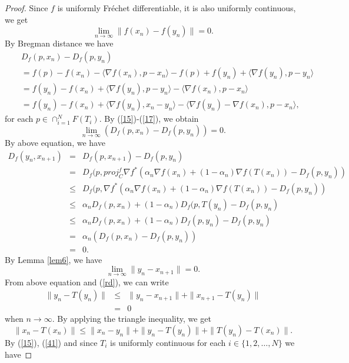 \documentclass[reqno,b5paper]{amsart}
\theoremstyle{plain}
\theoremstyle{definition}
\numberwithin{equation}{section}
\numberwithin{equation}{section}
\begin{document}
\begin{proof}
Since $f$ is uniformly Fr\'{e}chet differentiable, it is also uniformly continuous, we get
\begin{equation}\label{17}
\lim_{n\to\infty}\|f(x_{n})-f(y_{n})\|=0.
\end{equation}
By Bregman distance we have
\begin{eqnarray*}
&&D_{f}(p,x_{n})-D_{f}(p,y_{n})\\
&&=f(p)-f(x_{n})-\langle \nabla f(x_{n}),p-x_{n}\rangle -f(p)+f(y_{n})+\langle \nabla f(y_{n}),p-y_{n}\rangle\\
&&=f(y_{n})-f(x_{n})+\langle \nabla f(y_{n}),p-y_{n}\rangle-\langle \nabla f(x_{n}),p-x_{n}\rangle\\
&&=f(y_{n})-f(x_{n})+\langle \nabla f(y_{n}),x_{n}-y_{n}\rangle-\langle \nabla f(y_{n})-\nabla f(x_{n}),p-x_{n}\rangle,
\end{eqnarray*}
for each $p\in \cap_{i=1}^{N}F(T_{i})$. By (\ref{15})-(\ref{17}), we obtain
\begin{equation}\label{18}
\lim_{n\to\infty}(D_{f}(p,x_{n})-D_{f}(p,y_{n}))=0.
\end{equation}
By above equation, we have
\begin{eqnarray*}
D_{f}(y_{n},x_{n+1})&=&D_{f}(p,x_{n+1})-D_{f}(p,y_{n})\\
&=&D_{f}(p,proj_{C}^{f}\nabla f^{*}(\alpha_{n}\nabla f(x_{n})+(1-\alpha_{n})\nabla f(T(x_{n}))-D_{f}(p,y_{n}))\\
&\leq&D_{f}(p,\nabla f^{*}(\alpha_{n}\nabla f(x_{n})+(1-\alpha_{n})\nabla f(T(x_{n}))-D_{f}(p,y_{n}))\\
&\leq& \alpha_{n}D_{f}(p,x_{n})+(1-\alpha_{n})D_{f}(p,T(y_{n})-D_{f}(p,y_{n})\\
&\leq&\alpha_{n}D_{f}(p,x_{n})+(1-\alpha_{n})D_{f}(p,y_{n})-D_{f}(p,y_{n})\\
&=&\alpha_{n}(D_{f}(p,x_{n})-D_{f}(p,y_{n}))\\
&=&0.
\end{eqnarray*}
By Lemma \ref{lem6}, we have
$$\lim_{n\to\infty}\|y_{n}-x_{n+1}\|=0.$$
From above equation and (\ref{rd}), we can write
\begin{eqnarray}
\|y_{n}-T(y_{n})\|&\leq&\|y_{n}-x_{n+1}\|+\|x_{n+1}-T(y_{n})\|\nonumber\\
&=&0\label{41}
\end{eqnarray}
when $n\to\infty$.
By applying the triangle inequality, we get
$$\|x_{n}-T(x_{n})\|\leq \|x_{n}-y_{n}\|+\|y_{n}-T(y_{n})\|+\|T(y_{n})-T(x_{n})\|.$$
By (\ref{15}), (\ref{41}) and since $T_{i}$ is uniformly continuous for each $i\in\{1,2,\ldots,N\}$ we have

\end{proof}
\end{document}
